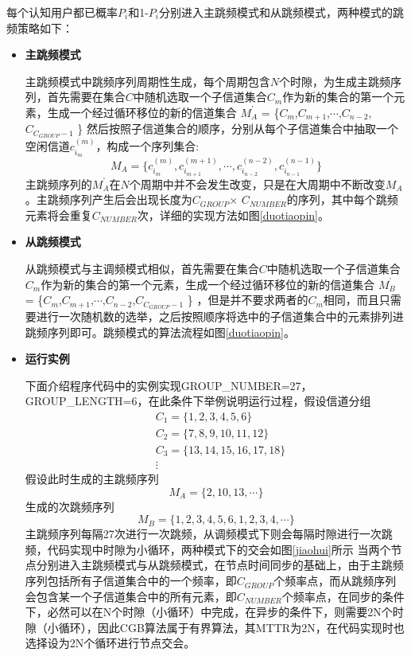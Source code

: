 \documentclass[a4paper,AutoFakeBold,oneside,12pt]{book}
\begin{document}
 
  每个认知用户都已概率$P_i$和1-$P_i$分别进入主跳频模式和从跳频模式，两种模式的跳频策略如下：
  \begin{itemize}
  \item \textbf{主跳频模式}
  
  主跳频模式中跳频序列周期性生成，每个周期包含$N$个时隙，为生成主跳频序列，首先需要在集合$C$中随机选取一个子信道集合$C_m$作为新的集合的第一个元素，生成一个经过循环移位的新的信道集合
$M^{’}_A$ =  \{$C_m$,$C_{m+1}$,$\cdots$,$C_{n-2}$,$C_{C_{GROUP}-1}$ \}
然后按照子信道集合的顺序，分别从每个子信道集合中抽取一个空闲信道$c^{(m)}_{i_m}$，构成一个序列集合:
\begin{equation}
 M_A = \{ c^{(m)}_{i_m},c^{(m+1)}_{i_{m+1}},\cdots,c^{(n-2)}_{i_{n-2}},c^{(n-1)}_{i_{n-1}} \}
 \end{equation}
 主跳频序列的$M^{’}_A$在$N$个周期中并不会发生改变，只是在大周期中不断改变$M_A$ 。主跳频序列产生后会出现长度为$C_{GROUP}$$\times$ $C_{NUMBER}$的序列，其中每个跳频元素将会重复$C_{NUMBER}$次，详细的实现方法如图\ref{duotiaopin}。

   \item \textbf{从跳频模式}
   
   从跳频模式与主调频模式相似，首先需要在集合$C$中随机选取一个子信道集合$C_m$作为新的集合的第一个元素，生成一个经过循环移位的新的信道集合
$M^{’}_B$ =  \{$C_m$,$C_{m+1}$,$\cdots$,$C_{n-2}$,$C_{C_{GROUP}-1}$ \}
，但是并不要求两者的$C_m$相同，而且只需要进行一次随机数的选举，之后按照顺序将选中的子信道集合中的元素排列进跳频序列即可。跳频模式的算法流程如图\ref{duotiaopin}。

  \item \textbf{运行实例}
  
  
  下面介绍程序代码中的实例实现GROUP\_NUMBER=27，GROUP\_LENGTH=6，在此条件下举例说明运行过程，假设信道分组
\begin{equation}
\begin{aligned}
&C_1 = \{ 1,2,3,4,5,6 \} \\
&C_2 = \{7,8,9,10,11,12\}\\
&C_3 = \{ 13,14,15,16,17,18 \}\\
&\vdots 
\end{aligned}
   \end{equation}
   假设此时生成的主跳频序列
   \begin{equation}
 M_A = \{ 2,10,13,\cdots \}
 \end{equation}
 生成的次跳频序列
  \begin{equation}
 M_B = \{ 1,2,3,4,5,6,1,2,3,4,\cdots \}
 \end{equation}
 主跳频序列每隔27次进行一次跳频，从调频模式下则会每隔时隙进行一次跳频，代码实现中时隙为小循环，两种模式下的交会如图\ref{jiaohui}所示
 当两个节点分别进入主跳频模式与从跳频模式，在节点时间同步的基础上，由于主跳频序列包括所有子信道集合中的一个频率，即$C_{GROUP}$个频率点，而从跳频序列会包含某一个子信道集合中的所有元素，即$C_{NUMBER}$个频率点，在同步的条件下，必然可以在N个时隙（小循环）中完成，在异步的条件下，则需要2N个时隙（小循环），因此CGB算法属于有界算法，其MTTR为2N，在代码实现时也选择设为2N个循环进行节点交会。
 \end{itemize}
\end{document}
